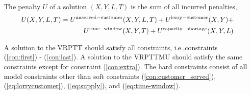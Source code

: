 The penalty $U$ of a solution $ (X,Y,L,T)$ is the sum of all incurred penalties,
\begin{align}
	U(X,Y,L,T) = U^{\rm unserved-customer}(X,Y,L,T) +
	U^{\rm lorry-customer}(X,Y) + \\
	U^{\rm time-window}(X,Y,T) +
	U^{\rm capacity-shortage}(X,Y,L) \notag
%
%
%
%
\end{align}


A solution to the VRPTT should satisfy all constraints, i.e.,constraints (\ref{con:first}) - (\ref{con:last}).
A solution to the VRPTTMU should satisfy the same constraints except for constraint (\ref{con:extra}).
The hard constraints consist of all model constraints other than soft constraints (\ref{con:customer_served}), (\ref{eq:lorrycustomer}), (\ref{eq:supply}), and (\ref{eq:time-window}).



